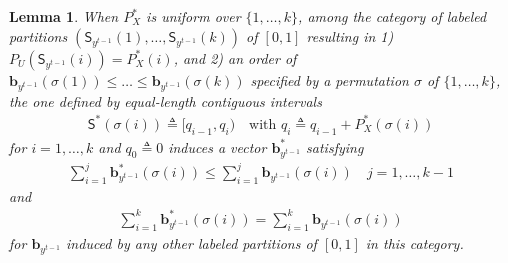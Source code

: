 \documentclass{article}
\newtheorem{lemma}{Lemma}
\def\sS{{\mathsf S}}
\def\deq{\triangleq}
\begin{document}
\begin{lemma}\label{lm:major_b}
When $P_X^*$ is uniform over $\{1,\ldots,k\}$,
among the category of labeled partitions $(\sS_{y^{t-1}}(1),\ldots,\sS_{y^{t-1}}(k))$ of $[0,1]$ resulting in 1) $P_U(\sS_{y^{t-1}}(i))=P_X^*(i)$, and 2) an order of $\boldsymbol{b}_{y^{t-1}}(\sigma(1)) \le \ldots \le \boldsymbol{b}_{y^{t-1}}(\sigma(k))$ specified by a permutation $\sigma$ of $\{1,\ldots,k\}$, the one defined by equal-length contiguous intervals
\begin{align}
    \sS^*(\sigma(i)) \deq [q_{i-1}, q_i)  \quad\text{with $q_i \deq q_{i-1} + P_X^*(\sigma(i))$} \label{eq:def_S*_unif_PX}
\end{align}
for $i=1,\ldots,k$ and $q_0 \deq 0$ induces a vector $\boldsymbol{b}^*_{y^{t-1}}$ satisfying 
\begin{align}
\sum_{i=1}^j \boldsymbol{b}_{y^{t-1}} ^*(\sigma(i))
    \le
    \sum_{i=1}^j \boldsymbol{b}_{y^{t-1}}(\sigma(i)) \quad j=1,\ldots, k-1 \label{eq:mj_b_1}
\end{align}
and 
\begin{align}
\sum_{i=1}^k \boldsymbol{b}_{y^{t-1}}^*(\sigma(i))
    =
    \sum_{i=1}^k \boldsymbol{b}_{y^{t-1}}(\sigma(i)) \label{eq:mj_b_2}
\end{align}
for $\boldsymbol{b}_{y^{t-1}}$ induced by any other labeled partitions of $[0,1]$ in this category.
\end{lemma}
\end{document}
